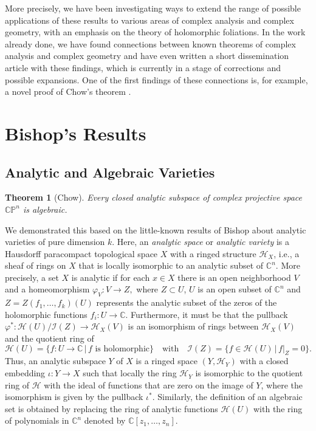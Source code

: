 \documentclass{article}
\newtheorem{theorem}{Theorem}
\newcommand{\co}{\ensuremath{\mathbb C }}
\newcommand{\con}{\ensuremath{\mathbb{C}^n}}
\newcommand{\cp}{\ensuremath{\mathbb{CP}}}
\begin{document}
More precisely, we have been investigating ways to extend the range of possible applications of these results to
various areas of complex analysis and complex geometry, with an emphasis on the theory of holomorphic foliations. In the work
already done, we have found connections between known theorems of complex analysis and complex geometry and have even
written a short dissemination article with these findings, which is currently in a stage of corrections
and possible expansions. One of the first findings of these connections is, for example, a novel proof of Chow's theorem \cite{Chow}.

\section{Bishop's Results}
\subsection{Analytic and Algebraic Varieties}
\begin{theorem}[Chow]\label{Chow}
        Every closed analytic subspace of complex projective space $\cp^{n}$ is algebraic.
\end{theorem}
\noindent We demonstrated this based on the little-known results of Bishop about analytic varieties of pure dimension $k$. Here, an \emph{analytic space} or \emph{analytic variety} is a Hausdorff paracompact topological space $X$ with a ringed structure $\mathcal{H}_X$, i.e., a sheaf of rings on $X$ that is locally isomorphic to an analytic subset of $\con$. More precisely, a set $X$ is analytic if for each $x\in X$ there is an open neighborhood $V$ and a homeomorphism $\varphi_V:V\rightarrow Z,$ where $Z\subset U$, $U$ is an open subset of $\con$ and $Z=Z(f_1,\dots,f_k)(U)$ represents the analytic subset of the zeros of the holomorphic functions $f_i:U\rightarrow\co$. Furthermore, it must be that the pullback $\varphi^{*}:\mathcal{H}(U)/\mathcal{I}(Z)\rightarrow \mathcal{H}_X(V)$
is an isomorphism of rings between $\mathcal{H}_X(V)$ and the quotient ring of
\[
        \mathcal{H}(U)=\{f:U\rightarrow\co\,|\,f \text{ is holomorphic}\}\quad\text{with}\quad\mathcal{I}(Z)=\{f\in\mathcal{H}(U)\,|\,f|_{Z}=0\}.
\]
Thus, an analytic subspace $Y$ of $X$ is a ringed space $(Y,\mathcal{H}_Y)$ with a closed embedding $\iota:Y\rightarrow X$ such that locally the ring
$\mathcal{H}_Y$ is isomorphic to the quotient ring of $\mathcal{H}$ with the ideal of functions that are zero on the image of $Y$, where the isomorphism is given by the
pullback $\iota^{*}$. Similarly, the definition of an algebraic set is obtained by replacing the ring of analytic functions $\mathcal{H}(U)$ with the ring of
polynomials in $\con$ denoted by $\co[z_1,\dots,z_n]$.
\end{document}
